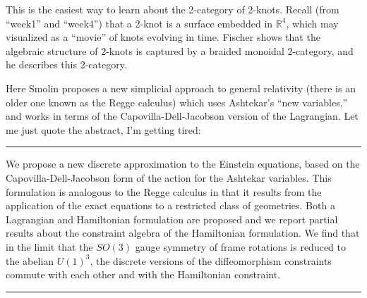 \documentclass{article}
\def\tightlist{}
\renewcommand{\texttt}[1]{%
  \begingroup
  \ttfamily
  \begingroup\lccode`~=`/\lowercase{\endgroup\def~}{/\discretionary{}{}{}}%
  \begingroup\lccode`~=`[\lowercase{\endgroup\def~}{[\discretionary{}{}{}}%
  \begingroup\lccode`~=`.\lowercase{\endgroup\def~}{.\discretionary{}{}{}}%
  \catcode`/=\active\catcode`[=\active\catcode`.=\active
  \scantokens{#1\noexpand}%
  \endgroup
}
\begin{document}

This is the easiest way to learn about the 2-category of 2-knots. Recall
(from ``week1'' and ``week4'') that a 2-knot is a surface embedded in
\(\mathbb{R}^4\), which may visualized as a ``movie'' of knots evolving
in time. Fischer shows that the algebraic structure of 2-knots is
captured by a braided monoidal 2-category, and he describes this
2-category.


Here Smolin proposes a new simplicial approach to general relativity
(there is an older one known as the Regge calculus) which uses
Ashtekar's ``new variables,'' and works in terms of the
Capovilla-Dell-Jacobson version of the Lagrangian. Let me just quote the
abstract, I'm getting tired:

\begin{center}\rule{0.5\linewidth}{0.5pt}\end{center}

We propose a new discrete approximation to the Einstein equations, based
on the Capovilla-Dell-Jacobson form of the action for the Ashtekar
variables. This formulation is analogous to the Regge calculus in that
it results from the application of the exact equations to a restricted
class of geometries. Both a Lagrangian and Hamiltonian formulation are
proposed and we report partial results about the constraint algebra of
the Hamiltonian formulation. We find that in the limit that the
\(SO(3)\) gauge symmetry of frame rotations is reduced to the abelian
\(U(1)^3\), the discrete versions of the diffeomorphism constraints
commute with each other and with the Hamiltonian constraint.

\begin{center}\rule{0.5\linewidth}{0.5pt}\end{center}
\end{document}
